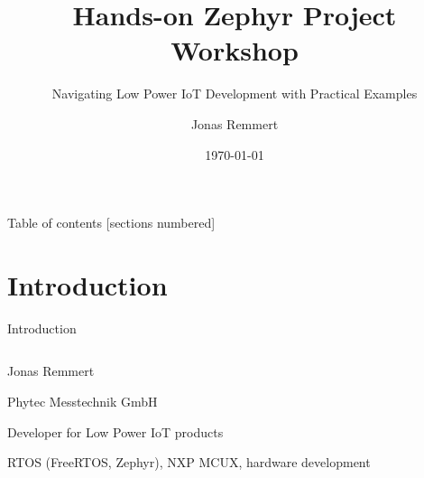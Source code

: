 \documentclass[10pt, aspectratio=169]{beamer}
\title{Hands-on Zephyr Project Workshop}
\subtitle{Navigating Low Power IoT Development with Practical Examples}
\author{Jonas Remmert}
\institute{IoT Embedded Systems Engineer at Phytec Messtechnik GmbH}
\date{\today}
\begin{document}
\begin{frame}
    \vspace*{0.5cm}  %
    \titlepage
\end{frame}
\begin{frame}{Table of contents}
  [sections numbered]
  \tableofcontents[]
\end{frame}
\section{Introduction}
\begin{frame}[fragile]{Introduction}
  \begin{columns}
    \begin{column}{0.6\textwidth}
      \begin{description}
        \item Jonas Remmert
        \item Phytec Messtechnik GmbH
        \item Developer for Low Power IoT products
        \item[Experience] RTOS (FreeRTOS, Zephyr), NXP MCUX, hardware development
      \end{description}
    \end{column}
    \begin{column}{0.4\textwidth}
    \end{column}
  \end{columns}
\end{frame}
\end{document}
